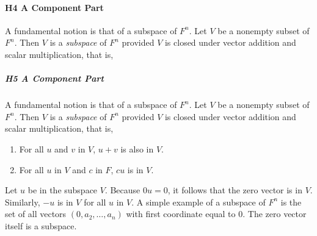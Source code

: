 \paragraph{H4 A Component Part }
A fundamental notion \cite{yao2002can} is that of a subspace of $F^n$. Let $V$ be a nonempty subset of 
$F^n$. Then $V$ is a {\it subspace} of $F^n$ provided $V$ is closed 
under vector addition and scalar multiplication, that is, 

\subparagraph{H5 A Component Part }
A fundamental notion \cite{yao2002can} is that of a subspace of $F^n$. Let $V$ be a nonempty subset of 
$F^n$. Then $V$ is a {\it subspace} of $F^n$ provided $V$ is closed 
under vector addition and scalar multiplication, that is, 
\begin{enumerate}
\item For all $u$ and $v$ in $V$, $u+v$ is 
also in $V$. 
\item For all $u$ in $V$ and $c$ in $F$, $cu$ is 
in $V$. 
\end{enumerate} 
Let $u$ be in the subspace $V$. Because $0u=0$, 
it follows that the zero vector is in $V$. Similarly, $-u$ is in $V$ 
for all $u$ in $V$. A simple example of a subspace of $F^n$ is the set 
of all vectors $(0,a_2,\ldots,a_n)$ with first coordinate equal to 0. 
The zero vector itself is a subspace.

